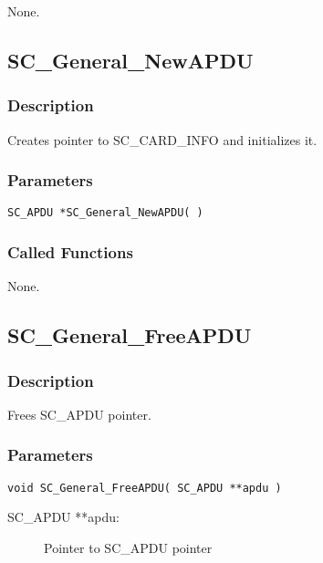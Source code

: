 \documentclass[a4paper,oneside]{article}
\begin{document}
None.


\subsection{SC\_General\_NewAPDU}

\subsubsection*{Description}

Creates pointer to SC\_CARD\_INFO and initializes it.

\subsubsection*{Parameters}

\begin{verbatim}
SC_APDU *SC_General_NewAPDU( )
\end{verbatim}

\subsubsection*{Called Functions}

None.


\subsection{SC\_General\_FreeAPDU}

\subsubsection*{Description}

Frees SC\_APDU pointer.

\subsubsection*{Parameters}

\begin{verbatim}
void SC_General_FreeAPDU( SC_APDU **apdu )
\end{verbatim}

\begin{description}
\item[SC\_APDU **apdu:] Pointer to SC\_APDU pointer
\end{description}
\end{document}
